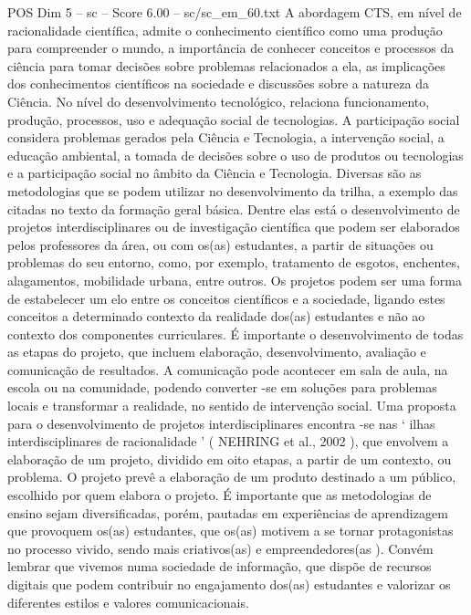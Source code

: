 \begin{textsample}{POS Dim 5 – sc – Score 6.00 – sc/sc\_em\_60.txt}
A abordagem CTS, em nível de racionalidade científica, admite o conhecimento científico como uma produção para compreender o mundo, a importância de conhecer conceitos e processos da ciência para tomar decisões sobre problemas relacionados a ela, as implicações dos conhecimentos científicos na sociedade e discussões sobre a natureza da Ciência.
No nível do desenvolvimento tecnológico, relaciona funcionamento, produção, processos, uso e adequação social de tecnologias.
A participação social considera problemas gerados pela Ciência e Tecnologia, a intervenção social, a educação ambiental, a tomada de decisões sobre o uso de produtos ou tecnologias e a participação social no âmbito da Ciência e Tecnologia.
Diversas são as metodologias que se podem utilizar no desenvolvimento da trilha, a exemplo das citadas no texto da formação geral básica.
Dentre elas está o desenvolvimento de projetos interdisciplinares ou de investigação científica que podem ser elaborados pelos professores da área, ou com os(as) estudantes, a partir de situações ou problemas do seu entorno, como, por exemplo, tratamento de esgotos, enchentes, alagamentos, mobilidade urbana, entre outros.
Os projetos podem ser uma forma de estabelecer um elo entre os conceitos científicos e a sociedade, ligando estes conceitos a determinado contexto da realidade dos(as) estudantes e não ao contexto dos componentes curriculares.
É importante o desenvolvimento de todas as etapas do projeto, que incluem elaboração, desenvolvimento, avaliação e comunicação de resultados.
A comunicação pode acontecer em sala de aula, na escola ou na comunidade, podendo converter -se em soluções para problemas locais e transformar a realidade, no sentido de intervenção social.
Uma proposta para o desenvolvimento de projetos interdisciplinares encontra -se nas ‘ ilhas interdisciplinares de racionalidade ’ ( NEHRING et al., 2002 ), que envolvem a elaboração de um projeto, dividido em oito etapas, a partir de um contexto, ou problema.
O projeto prevê a elaboração de um produto destinado a um público, escolhido por quem elabora o projeto.
É importante que as metodologias de ensino sejam diversificadas, porém, pautadas em experiências de aprendizagem que provoquem os(as) estudantes, que os(as) motivem a se tornar protagonistas no processo vivido, sendo mais criativos(as) e empreendedores(as ).
Convém lembrar que vivemos numa sociedade de informação, que dispõe de recursos digitais que podem contribuir no engajamento dos(as) estudantes e valorizar os diferentes estilos e valores comunicacionais.

\end{textsample}
